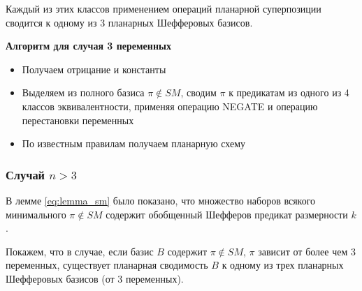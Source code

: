 \documentclass[12pt]{article}
\begin{document}
Каждый из этих классов применением операций планарной суперпозиции сводится к одному из 3
планарных Шефферовых базисов.

\textbf{Алгоритм для случая 3 переменных}
\begin{itemize}
\item{Получаем отрицание и константы}
\item{Выделяем из полного базиса $\pi \notin SM$, сводим $\pi$ к предикатам из одного из 4 классов эквивалентности, 
применяя операцию NEGATE и операцию перестановки переменных}
\item{По известным правилам получаем планарную схему}
\end{itemize}

\subsubsection{Случай $n > 3$}
В лемме \ref{eq:lemma_sm} было показано, что множество наборов всякого минимального $\pi \notin SM$ содержит обобщенный
Шефферов предикат размерности $k$.

Покажем, что в случае, если базис $B$ содержит $\pi \notin SM$, $\pi$ зависит от более чем 3 переменных, существует планарная
сводимость $B$ к одному из трех планарных Шефферовых базисов (от 3 переменных).
\end{document}

